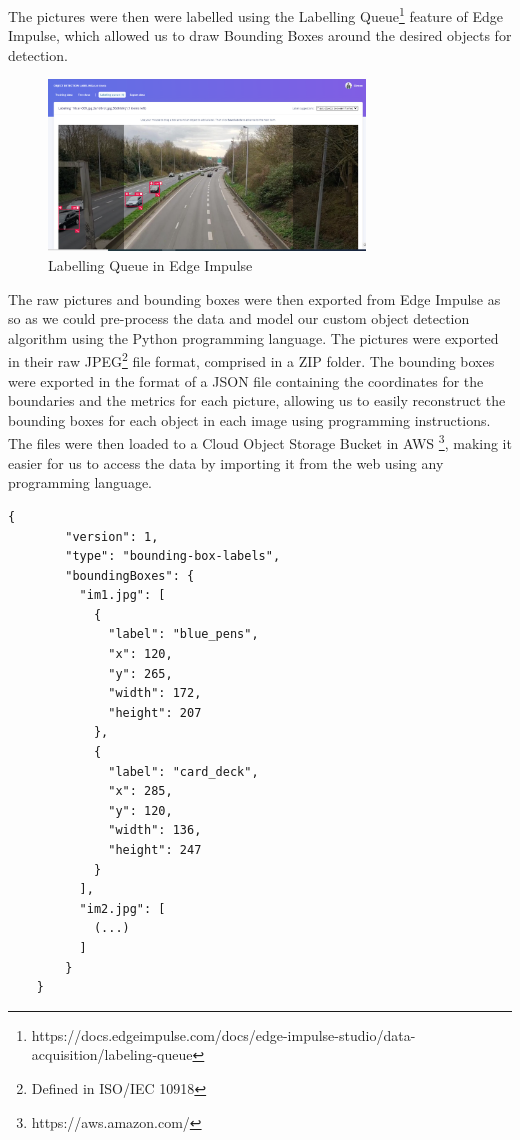 \documentclass[openright]{normas-utf-tex} %
\begin{document}
The pictures were then were labelled using the Labelling Queue\footnote{https://docs.edgeimpulse.com/docs/edge-impulse-studio/data-acquisition/labeling-queue}
feature of Edge Impulse, which allowed us to draw Bounding Boxes around the desired objects for detection.

\begin{figure}[H]
	\centering
	\includegraphics[width=0.75\textwidth]{./images/edge-impulse-labelling-queue.png}
	\caption[Labelling Queue in Edge Impulse]{Labelling Queue in Edge Impulse}
    \label{fig:diff}
\end{figure}

The raw pictures and bounding boxes were then exported from Edge Impulse as so as
we could pre-process the data and model our custom object detection algorithm using the 
Python programming language.
The pictures were exported in their raw JPEG\footnote{Defined in ISO/IEC 10918}  file format, 
comprised in a ZIP folder.
The bounding boxes were exported in the format of a JSON file containing the coordinates for the boundaries
and the metrics for each picture, allowing us to easily reconstruct the bounding boxes for each object 
in each image using programming instructions. The files were then loaded to a Cloud Object Storage Bucket in AWS
\footnote{https://aws.amazon.com/}, making it easier for us to access the data by importing it from 
the web using any programming language.

\begin{lstlisting}[caption={Bounding boxes coordinates file exported from Edge Impulse},label={lst:boundingBoxCoordinates}]
	{
		"version": 1,
		"type": "bounding-box-labels",
		"boundingBoxes": {
		  "im1.jpg": [
			{
			  "label": "blue_pens",
			  "x": 120,
			  "y": 265,
			  "width": 172,
			  "height": 207
			},
			{
			  "label": "card_deck",
			  "x": 285,
			  "y": 120,
			  "width": 136,
			  "height": 247
			}
		  ],
		  "im2.jpg": [
			(...)
		  ]
		}
	}
\end{lstlisting}
\end{document}
